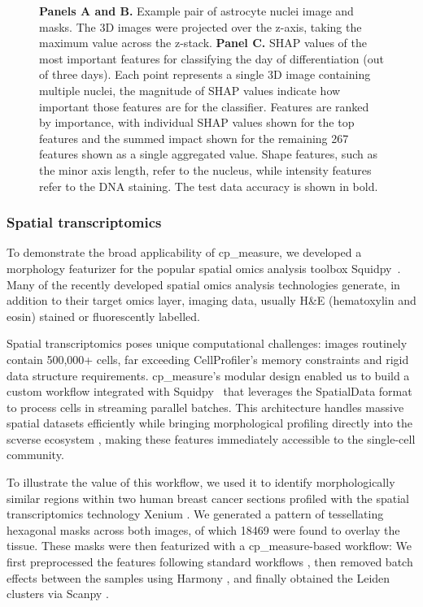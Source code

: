 \documentclass{article}
\begin{document}
\begin{figure}[htbp]
\centering

\caption{\label{fig:astrocytes}\textbf{Panels A and B.} Example pair of astrocyte nuclei image and masks. The 3D images were projected over the z-axis, taking the maximum value across the z-stack. \textbf{Panel C.} SHAP values of the most important features for classifying the day of differentiation (out of three days). Each point represents a single 3D image containing multiple nuclei, the magnitude of SHAP values indicate how important those features are for the classifier. Features are ranked by importance, with individual SHAP values shown for the top features and the summed impact shown for the remaining 267 features shown as a single aggregated value. Shape features, such as the minor axis length, refer to the nucleus, while intensity features refer to the DNA staining. The test data accuracy is shown in bold.}
\end{figure}

\subsubsection{Spatial transcriptomics}
\label{sec:org5711d86}
To demonstrate the broad applicability of cp\_measure, we developed a morphology featurizer for the popular spatial omics analysis toolbox Squidpy~\citep{pallaSquidpyScalableFramework2022}.
Many of the recently developed spatial omics analysis technologies generate, in addition to their target omics layer, imaging data, usually H\&E (hematoxylin and eosin) stained or fluorescently labelled. 

Spatial transcriptomics poses unique computational challenges: images routinely contain 500,000+ cells, far exceeding CellProfiler's memory constraints and rigid data structure requirements. 
cp\_measure's modular design enabled us to build a custom workflow integrated with Squidpy~\citep{pallaSquidpyScalableFramework2022} that leverages the SpatialData format \citep{Marconato2024-SpatialData} to process cells in streaming parallel batches. 
This architecture handles massive spatial datasets efficiently while bringing morphological profiling directly into the scverse ecosystem \citep{Virshup2023-scverse}, making these features immediately accessible to the single-cell community.

To illustrate the value of this workflow, we used it to identify morphologically similar regions within two human breast cancer sections profiled with the spatial transcriptomics technology Xenium \citep{10x-Genomics2023-el}. We generated a pattern of tessellating hexagonal masks across both images, of which 18469 were found to overlay the tissue. These masks were then featurized with a cp\_measure-based workflow: We first preprocessed the features following standard workflows
\citep{serranoReproducibleImagebasedProfiling2025}, then removed batch effects between the samples using Harmony \citep{Korsunsky2019-Harmony}, and finally obtained the Leiden clusters via Scanpy \citep{wolfSCANPYLargescaleSinglecell2018, Traag2019-fr}. 
\end{document}

